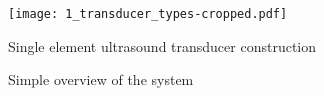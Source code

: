 \begin{figure}[ht]
	\centering
	\texttt{[image: 1\_transducer\_types-cropped.pdf]}
	\caption{Single element ultrasound transducer construction \cite{JensenUltrasoundBook}}
	\label{fig:1_transducer_types}
\end{figure}

\begin{figure}[ht]
	\centering
	\resizebox{\textwidth}{!}{
		
	}
	\caption{Simple overview of the system}
	\label{fig:1_system_overview}
\end{figure}


